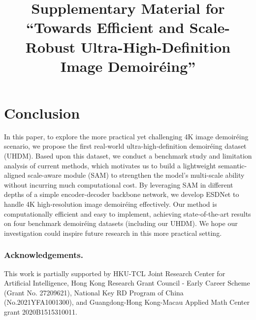 \documentclass[runningheads]{llncs}
\begin{document}
\section{Conclusion}
In this paper, to explore the more practical yet challenging 4K image demoiréing scenario, we propose the first real-world ultra-high-definition demoiréing dataset (UHDM). Based upon this dataset, we conduct a benchmark study and limitation analysis of current methods, which motivates us to build a lightweight semantic-aligned scale-aware module (SAM) to strengthen the model's multi-scale ability without incurring much computational cost.
By leveraging SAM in different depths of a simple encoder-decoder backbone network, we develop ESDNet to handle 4K high-resolution image demoiréing effectively.
Our method is computationally efficient and easy to implement, achieving state-of-the-art results on four benchmark demoiréing datasets (including our UHDM). We hope our investigation could inspire future research in this more practical setting.

\subsubsection{Acknowledgements.} 
This work is partially supported by HKU-TCL Joint Research Center for Artificial Intelligence, Hong Kong Research Grant Council - Early Career Scheme (Grant No. 27209621), National Key RD Program of China (No.2021YFA1001300), and Guangdong-Hong Kong-Macau Applied Math Center grant 2020B1515310011.

\clearpage





\title{Supplementary Material for\\
 ``Towards Efficient and Scale-Robust Ultra-High-Definition Image Demoiréing''} 
\renewcommand{\thefootnote}{\textrm{\Letter}} 

\author{}
\institute{}

\maketitle
   
\renewcommand*{\thesection}{\Alph{section}}
\setcounter{section}{0}
\end{document}
